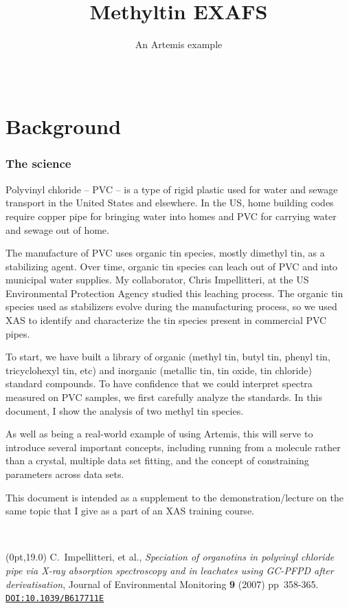 \documentclass[10pt, xcolor=x11names, compress]{beamer}
\title{Methyltin EXAFS}%
\subtitle{An Artemis example}
\date{~}
\begin{document}
\begin{frame}
  \titlepage
\end{frame}


\section{Background}

\begin{frame}
  \frametitle{The science}
  \footnotesize%
  Polyvinyl chloride -- PVC -- is a type of rigid plastic used for
  water and sewage transport in the United States and elsewhere.  In
  the US, home building codes require copper pipe for bringing water
  into homes and PVC for carrying water and sewage out of home.

  \medskip

  The manufacture of PVC uses organic tin species, mostly dimethyl
  tin, as a stabilizing agent.  Over time, organic tin species can
  leach out of PVC and into municipal water supplies.  My collaborator,
  Chris Impellitteri, at the US Environmental Protection Agency studied
  this leaching process.  The organic tin species used as stabilizers
  evolve during the manufacturing process, so we used XAS to identify
  and characterize the tin species present in commercial PVC pipes.

  \medskip

  To start, we have built a library of organic (methyl tin, butyl tin,
  phenyl tin, tricyclohexyl tin, etc) and inorganic (metallic tin, tin
  oxide, tin chloride) standard compounds.  To have confidence that we
  could interpret spectra measured on PVC samples, we first carefully
  analyze the standards.  In this document, I show the analysis of two
  methyl tin species.

  \medskip

  As well as being a real-world example of using Artemis, this will
  serve to introduce several important concepts, including running
  {\feff} from a molecule rather than a crystal, multiple data set
  fitting, and the concept of constraining parameters across data
  sets.

  \medskip

  This document is intended as a supplement to the
  demonstration/lecture on the same topic that I give as a part of an
  XAS training course.

  \medskip

  ~

  \begin{textblock*}{0.7\linewidth}(0pt,19.0\TPVertModule)%
    \tiny%
    C.\ Impellitteri, et al., \textit{Speciation of organotins in
      polyvinyl chloride pipe via X-ray absorption spectroscopy and in
      leachates using GC-PFPD after derivatisation}, Journal of
    Environmental Monitoring \textbf{9} (2007) pp\ 358-365.
    \href{http://dx.doi.org/10.1039/B617711E}
    {\color{Blue4}\texttt{DOI:10.1039/B617711E}}
  \end{textblock*}
\end{frame}
\end{document}
